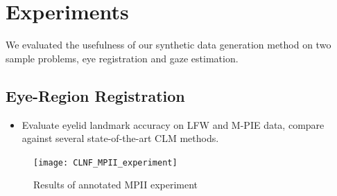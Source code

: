 
\section{Experiments}

We evaluated the usefulness of our synthetic data generation method on two sample problems, eye registration and gaze estimation.


\subsection{Eye-Region Registration}


\begin{itemize}
    \item Evaluate eyelid landmark accuracy on LFW and M-PIE data, compare against several state-of-the-art CLM methods.
\end{itemize}

\begin{figure}
    \centering
    \texttt{[image: CLNF\_MPII\_experiment]}
    \caption{Results of annotated MPII experiment}
    \label{fig:clnf_results}
\end{figure}

